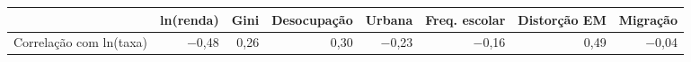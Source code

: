 \begin{tabular}{@{}lrrrrrrr@{}}
\toprule
 & \textbf{ln(renda)} & \textbf{Gini} & \textbf{Desocupação} & \textbf{Urbana} & \textbf{Freq. escolar} & \textbf{Distorção EM} & \textbf{Migração}\\
\midrule
Correlação com ln(taxa) & $-$0,48 & 0,26 & 0,30 & $-$0,23 & $-$0,16 & 0,49 & $-$0,04\\
\bottomrule
\end{tabular}
